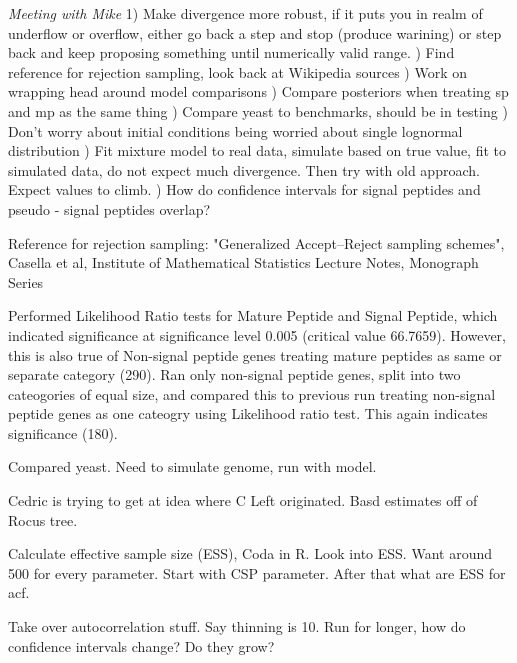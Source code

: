 \documentclass[11pt]{labbook}
\begin{document}
\textit{Meeting with Mike}
1) Make divergence more robust, if it puts you in realm of underflow or overflow, either go back a step and stop (produce warining) or step back and keep proposing something until numerically valid range. ) Find reference for rejection sampling, look back at Wikipedia sources ) Work on wrapping head around model comparisons ) Compare posteriors when treating sp and mp as the same thing ) Compare yeast to benchmarks, should be in testing ) Don't worry about initial conditions being worried about single lognormal distribution ) Fit mixture model to real data, simulate based on true value, fit to simulated data, do not expect much divergence. Then try with old approach. Expect values to climb. ) How do confidence intervals for signal peptides and pseudo - signal peptides overlap? \newline


Reference for rejection sampling: "Generalized Accept–Reject sampling schemes", Casella et al, Institute of Mathematical Statistics Lecture Notes, Monograph Series \newline

Performed Likelihood Ratio tests for Mature Peptide and Signal Peptide, which indicated significance at significance level 0.005 (critical value 66.7659). However, this is also true of Non-signal peptide genes treating mature peptides as same or separate category (290). Ran only non-signal peptide genes, split into two cateogories of equal size, and compared this to previous run treating non-signal peptide genes as one cateogry using Likelihood ratio test. This again indicates significance (180). \newline
 
Compared yeast. Need to simulate genome, run with model.

Cedric is trying to get at idea where C Left originated. Basd estimates off of Rocus tree. 

Calculate effective sample size (ESS), Coda in R. Look into ESS. Want around 500 for every parameter. Start with CSP parameter. After that what are ESS for acf. 

Take over autocorrelation stuff. Say thinning is 10. Run for longer, how do confidence intervals change? Do they grow? 
\end{document}
